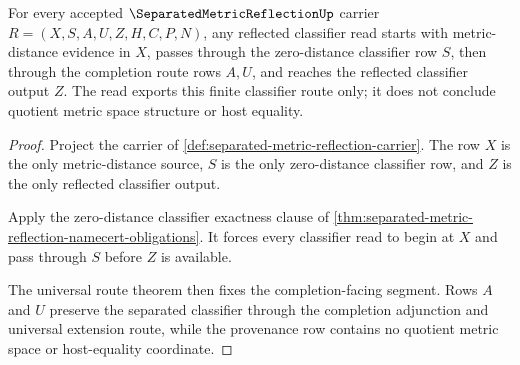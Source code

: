 \begin{theorem}
\label{thm:separated-metric-reflection-zero-distance-exactness}
For every accepted $\SeparatedMetricReflectionUp$ carrier $R=(X,S,A,U,Z,H,C,P,N)$, any reflected classifier read starts with metric-distance evidence in $X$, passes through the zero-distance classifier row $S$, then through the completion route rows $A,U$, and reaches the reflected classifier output $Z$. The read exports this finite classifier route only; it does not conclude quotient metric space structure or host equality.
\end{theorem}
\begin{proof}
Project the carrier of \autoref{def:separated-metric-reflection-carrier}. The row $X$ is the only metric-distance source, $S$ is the only zero-distance classifier row, and $Z$ is the only reflected classifier output.

Apply the zero-distance classifier exactness clause of \autoref{thm:separated-metric-reflection-namecert-obligations}. It forces every classifier read to begin at $X$ and pass through $S$ before $Z$ is available.

The universal route theorem then fixes the completion-facing segment. Rows $A$ and $U$ preserve the separated classifier through the completion adjunction and universal extension route, while the provenance row contains no quotient metric space or host-equality coordinate.
\end{proof}

